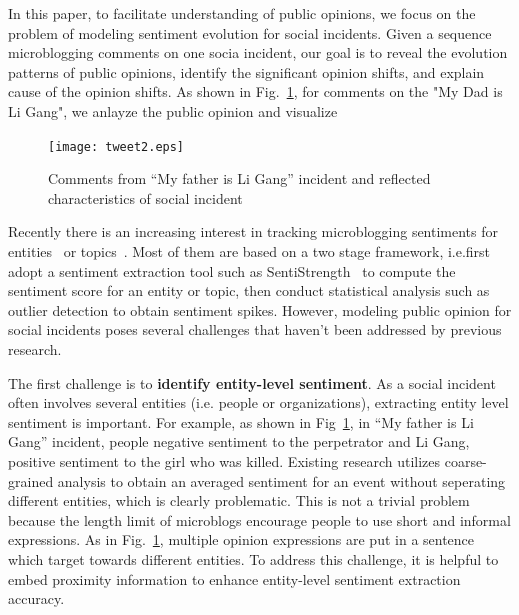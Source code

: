 \documentclass[runningheads]{llncs}
\begin{document}
In this paper, to facilitate understanding of public opinions, we focus on the problem of modeling sentiment evolution for social incidents. 
Given a sequence microblogging comments on one socia incident, our goal is to reveal the evolution patterns of public opinions, identify the significant opinion shifts, and explain cause of the opinion shifts. 
As shown in Fig.~\ref{fig:tweet}, for comments on the "My Dad is Li Gang", we anlayze the public opinion and visualize %


\begin{figure}
    \centering
    \texttt{[image: tweet2.eps]}
    \setlength{\abovecaptionskip}{-0.1cm}
    \caption{Comments from ``My father is Li Gang'' incident and reflected characteristics of social incident}\label{fig:tweet}
\end{figure}

Recently there is an increasing interest in tracking microblogging sentiments for entities~\cite{Giachanou2016sentichange,Giachanou2017sentichange} or topics~\cite{Tsytsarau2014Topics,Thelwall2011topic}. Most of them are based on a two stage framework, i.e.first adopt a sentiment extraction tool such as SentiStrength~\cite{sentistrength2010} to compute the sentiment score for an entity or topic, then conduct statistical analysis such as outlier detection to obtain sentiment spikes. However, modeling public opinion for social incidents poses several challenges that haven't been addressed by previous research.

The first challenge is to \textbf{identify entity-level sentiment}. 
As a social incident often involves several entities (i.e. people or organizations), extracting entity level sentiment is important.
For example, as shown in Fig~\ref{fig:tweet}, in ``My father is Li Gang'' incident, people negative sentiment to the perpetrator and Li Gang, positive sentiment to the girl who was killed. Existing research utilizes coarse-grained analysis to obtain an averaged sentiment for an event without seperating different entities, which is clearly problematic.%
This is not a trivial problem because the length limit of microblogs encourage people to use short and informal expressions.
As in Fig.~\ref{fig:tweet}, multiple opinion expressions are put in a sentence which target towards different entities. %
To address this challenge, it is helpful to embed proximity information to enhance entity-level sentiment extraction accuracy. 
\end{document}
